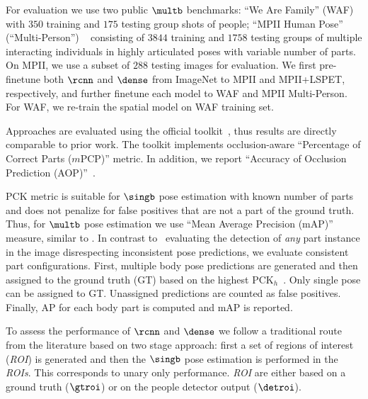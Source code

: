  For evaluation we use two public $\multb$
benchmarks: ``We Are Family'' (WAF)~\cite{eichner10eccv} with $350$
training and $175$ testing group shots of people;
``MPII Human Pose'' (``Multi-Person'') ~\cite{andriluka14cvpr}
consisting of $3844$ training
and $1758$ testing groups
of multiple interacting individuals in highly articulated poses with
variable number of parts. On MPII, we use a subset of $288$ testing
images for evaluation.
We first pre-finetune both $\rcnn$ and $\dense$ from ImageNet to MPII
and MPII+LSPET, respectively, and further finetune each model to WAF
and MPII Multi-Person. For WAF, we re-train the spatial model on WAF
training set.

 Approaches are evaluated using
the official toolkit~\cite{eichner10eccv}, thus results are directly
comparable to prior work. The toolkit implements occlusion-aware
``Percentage of Correct Parts ($m$PCP)'' metric. In addition, we
report ``Accuracy of Occlusion Prediction
(AOP)''~\cite{Chen:2015:POC}.

 PCK metric is
suitable for $\singb$ pose estimation with known number of parts and
does not penalize for false positives that are not a part of the
ground truth.
Thus, for $\multb$ pose estimation we use ``Mean Average Precision
(mAP)'' measure, similar to \cite{Sun:2011:APM,yang12pami}. In
contrast to~\cite{Sun:2011:APM,yang12pami} evaluating the detection of
\emph{any} part instance in the image disrespecting inconsistent pose
predictions, we evaluate consistent part configurations. First,
multiple body pose predictions are generated and then assigned to the
ground truth (GT) based on the highest
PCK$_h$~\cite{andriluka14cvpr}. Only single pose can be assigned to
GT. Unassigned predictions are counted as false positives. Finally, AP
for each body part is computed and mAP is reported.

 To assess the performance of $\rcnn$ and
$\dense$ we follow a traditional route from the literature based on
two stage approach: first a set of regions of interest (\emph{ROI}) is
generated and then the $\singb$ pose estimation is performed in the
\emph{ROIs}. This corresponds to unary only performance. \emph{ROI}
are either based on a ground truth ($\gtroi$) or on the people
detector output ($\detroi$).

